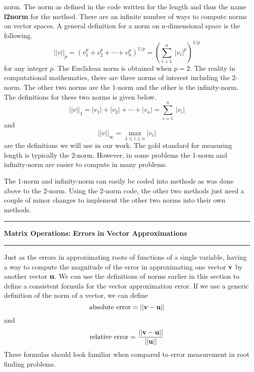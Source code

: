 \documentclass[10pt,fleqn]{article}
\begin{document}
norm. The norm as defined in the code written for the length and thus the name
{\bf l2norm} for the method. There are an infinite number of ways to compute
norms on vector spaces. A general definition for a norm on n-dimensional space
is the following.
$$
  ||v||_p = \left( v_1^p + v_2^p + \cdots + v_n^p \right)^{1/p}
              = \left( \sum_{i=1}^n\ |v_i|^p \right)^{1/p}
$$
for any integer $p$. The Euclidean norm is obtained when $p=2$. The reality
in computational mathematics, there are three norms of interest including the
2-norm. The other two norms are the 1-norm and the other is the infinity-norm.
The definitions for these two norms is given below.
$$
  ||v||_1 = | v_1 | + | v_2 | + \cdots + | v_n | = \sum_{i=1}^n\ |v_i|
$$
and
$$
  ||v||_\infty = \max_{1\leq i\leq n} | v_i | 
$$
are the definitions we will use in our work. The gold standard for measuring
length is typically the 2-norm. However, in some problems the 1-norm and
infinity-norm are easier to compute in many problems.

The 1-norm and infinity-norm can easily be coded into methods as was done above
to the 2-norm. Using the 2-norm code, the other two methods just need a couple
of minor changes to implement the other two norms into their own methods.
\newpage
\vskip0.1in\hrule\vskip0.1in
\noindent
{\bf Matrix Operations: Errors in Vector Approximations}
\vskip0.1in\hrule\vskip0.1in
\noindent
Just as the errors in approximating roots of functions of a single variable,
having a way to compute the magnitude of the error in approximating one vector
${\bf v}$ by another vector ${\bf u}$. We can use the definitions of norms
earlier in this section to define a consistent formula for the vector
approximation error. If we use a generic definition of the norm of a vector, we
can define
$$
  \makebox{absolute error} = || {\bf v} - {\bf u} ||
$$
and
$$
  \makebox{relative error} = {{|| {\bf v} - {\bf u} || }\over{ || {\bf u} || }}
$$
These formulas should look familiar when compared to error measurement in root
finding problems.
\end{document}
